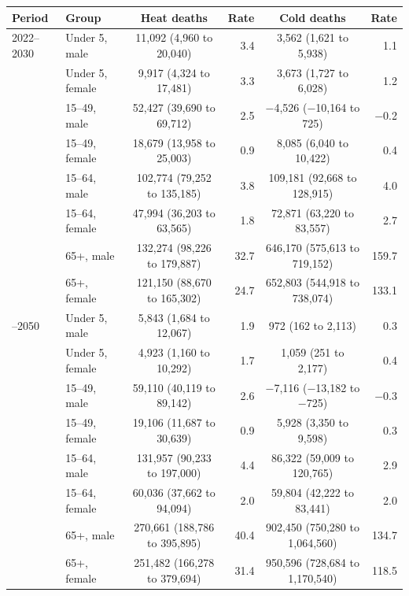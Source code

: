 \begin{tabular}{llcrcr}
\toprule
Period & Group & Heat deaths & Rate & Cold deaths & Rate \\
\midrule
2022--2030 & Under 5, male & 11,092 (4,960 to 20,040) & 3.4 & 3,562 (1,621 to 5,938) & 1.1 \\
 & Under 5, female & 9,917 (4,324 to 17,481) & 3.3 & 3,673 (1,727 to 6,028) & 1.2 \\
 & 15--49, male & 52,427 (39,690 to 69,712) & 2.5 & $-$4,526 ($-$10,164 to 725) & $-$0.2 \\
 & 15--49, female & 18,679 (13,958 to 25,003) & 0.9 & 8,085 (6,040 to 10,422) & 0.4 \\
 & 15--64, male & 102,774 (79,252 to 135,185) & 3.8 & 109,181 (92,668 to 128,915) & 4.0 \\
 & 15--64, female & 47,994 (36,203 to 63,565) & 1.8 & 72,871 (63,220 to 83,557) & 2.7 \\
 & 65+, male & 132,274 (98,226 to 179,887) & 32.7 & 646,170 (575,613 to 719,152) & 159.7 \\
 & 65+, female & 121,150 (88,670 to 165,302) & 24.7 & 652,803 (544,918 to 738,074) & 133.1 \\
\addlinespace
2041--2050 & Under 5, male & 5,843 (1,684 to 12,067) & 1.9 & 972 (162 to 2,113) & 0.3 \\
 & Under 5, female & 4,923 (1,160 to 10,292) & 1.7 & 1,059 (251 to 2,177) & 0.4 \\
 & 15--49, male & 59,110 (40,119 to 89,142) & 2.6 & $-$7,116 ($-$13,182 to $-$725) & $-$0.3 \\
 & 15--49, female & 19,106 (11,687 to 30,639) & 0.9 & 5,928 (3,350 to 9,598) & 0.3 \\
 & 15--64, male & 131,957 (90,233 to 197,000) & 4.4 & 86,322 (59,009 to 120,765) & 2.9 \\
 & 15--64, female & 60,036 (37,662 to 94,094) & 2.0 & 59,804 (42,222 to 83,441) & 2.0 \\
 & 65+, male & 270,661 (188,786 to 395,895) & 40.4 & 902,450 (750,280 to 1,064,560) & 134.7 \\
 & 65+, female & 251,482 (166,278 to 379,694) & 31.4 & 950,596 (728,684 to 1,170,540) & 118.5 \\
\bottomrule
\end{tabular}
